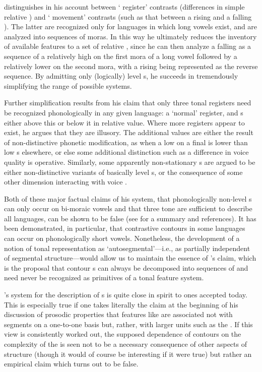 {\Trubetzkoy} distinguishes in his account between ` register'
contrasts (differences in simple relative ) and ` movement'
contrasts (such as that between a rising and a falling ). The
latter are recognized only for languages in which long vowels exist,
and are analyzed into sequences of moras. In this way he ultimately
reduces the inventory of available  features to a set of relative
, since he can then analyze a falling  as a sequence of a
relatively high  on the first mora of a long vowel followed by a
relatively lower  on the second mora, with a rising  being
represented as the reverse sequence. By admitting only (logically)
level s, he succeeds in tremendously simplifying the range of
possible  systems.

Further simplification results from his claim that only three tonal
registers need be recognized phonologically in any given language: a
`normal' register, and s either above this or below it in relative
value. Where more  registers appear to exist, he argues that they
are illusory. The additional values are either the result of
non-distinctive phonetic modification, as when a low  on a final
 is lower than low s elsewhere, or else some additional
distinction such as a difference in voice quality is
operative. Similarly, some apparently non-stationary s are argued
to be either non-distinctive variants of basically level s, or the
consequence of some other dimension interacting with voice .

Both of these major factual claims of his system, that phonologically
non-level s can only occur on bi-moraic vowels and that three tone
 are sufficient to describe all languages, can be shown to be
false (see \citealt{sra78:tone_features} for a summary and
references). It has been demonstrated, in particular, that contrastive
 contours in some languages can occur on phonologically short
vowels. Nonetheless, the development of a notion of tonal
representation as `autosegmental'—i.e., as partially independent of
segmental structure—would allow us to maintain the essence of
{\Trubetzkoy}'s claim, which is the proposal that contour s can
always be decomposed into sequences of  and need never be
recognized as primitives of a tonal feature system.

{\Trubetzkoy}'s system for the description of s is quite close in
spirit to ones accepted today. This is especially true if one takes
literally the claim at the beginning of his discussion of prosodic
properties that features like  are associated not with segments on
a one-to-one basis but, rather, with larger units such as the
. If this view is consistently worked out, the supposed
dependence of  contours on the complexity of the  
is seen not to be a necessary consequence of other aspects of
structure (though it would of course be interesting if it were true)
but rather an empirical claim which turns out to be false.

